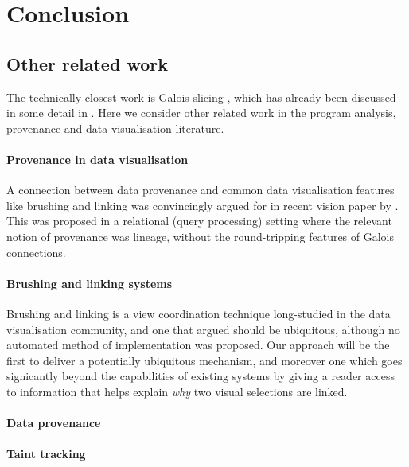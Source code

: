 \section{Conclusion}
\label{sec:conclusion}

\subsection{Other related work}
\label{sec:conclusion:other-related-work}

The technically closest work is Galois slicing \cite{perera12a,ricciotti17,perera16d}, which has already been discussed in some detail in . Here we consider other related work in the program analysis, provenance and data visualisation literature.

\paragraph{Provenance in data visualisation}

A connection between data provenance and common data visualisation features like brushing and linking was convincingly argued for in recent vision paper by \citet{psallidas18}. This was proposed in a relational (query processing) setting where the relevant notion of provenance was lineage, without the round-tripping features of Galois connections.

\paragraph{Brushing and linking systems}

Brushing and linking is a view coordination technique long-studied in the data visualisation community, and one that \citet{roberts06} argued should be ubiquitous, although no automated method of implementation was proposed. Our approach will be the first to deliver a potentially ubiquitous mechanism, and moreover one which goes signicantly beyond the capabilities of existing systems by giving a reader access to information that helps explain \emph{why} two visual selections are linked.

\paragraph{Data provenance}

\paragraph{Taint tracking}

